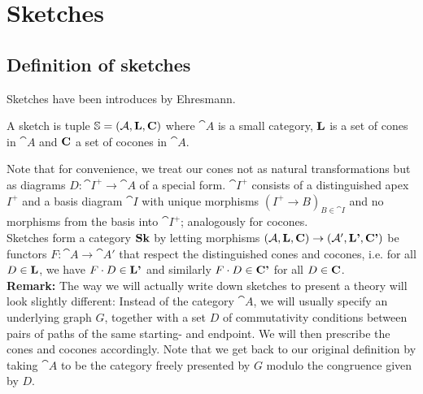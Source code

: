 \section{Sketches}
\label{sec:sketches}

\subsection{Definition of sketches}

Sketches have been introduces by Ehresmann. %

\begin{Definition}[Sketch]
A sketch is tuple $\mathbb S = (\mathcal{A}, \textbf{L}, \textbf{C})$ where $\cat A$ is a small category, $\textbf{L}$ is a set of cones in $\cat A$ and $\textbf{C}$ a set of cocones in $\cat A$.
\end{Definition}

Note that for convenience, we treat our cones not as natural transformations but as diagrams $D : \cat I^+ \to \cat A$ of a special form. $\cat I^+$ consists of a distinguished apex $I^+$ and a basis diagram $\cat I$ with unique morphisms $(I^+ \to B)_{B \in \cat I}$ and no morphisms from the basis into $\cat I^+$; analogously for cocones. \\

Sketches form a category $\mathbf{Sk}$ by letting morphisms $(\mathcal{A}, \textbf{L}, \textbf{C}) \to (\mathcal{A}', \textbf{L'}, \textbf{C'})$ be functors $F : \cat A \to \cat A'$ that respect the distinguished cones and cocones, i.e. for all $D \in \textbf{L}$, we have $F \cdot D \in \textbf{L'}$ and similarly $F \cdot D \in \textbf{C'}$ for all $D \in \textbf{C}$. \\

\textbf{Remark: } The way we will actually write down sketches to present a theory will look slightly different: Instead of the category $\cat A$, we will usually specify an underlying graph $G$, together with a set $D$ of commutativity conditions between pairs of paths of the same starting- and endpoint. We will then prescribe the cones and cocones accordingly. Note that we get back to our original definition by taking $\cat A$ to be the category freely presented by $G$ modulo the congruence given by $D$. 

